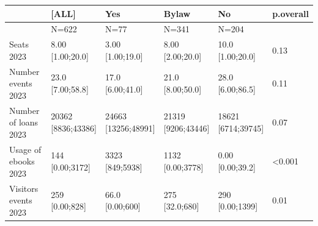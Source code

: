 \documentclass[a4paper,
fontsize=11pt,
oneside,
numbers=noperiodatend,
parskip=half-,
bibliography=totoc,
final
]{scrartcl}
\begin{document}
\begin{landscape}
\begin{table}[]\centering
\begin{tabular}{|l|l|l|l|l|l|}
\hline
                                 & \textbf{{[}ALL{]}}       & \textbf{Yes}             & \textbf{Bylaw}           & \textbf{No}            & \textbf{p.overall} \\ \hline
                                 & N=622                    & N=77                     & N=341                    & N=204                  &                    \\ \hline
Seats 2023                       & \makecell{8.00 \\ {[}1.00;20.0{]}}     & \makecell{3.00 \\ {[}1.00;19.0{]}}     & \makecell{8.00 \\ {[}2.00;20.0{]}}     & \makecell{10.0 \\ {[}1.00;20.0{]}}   & 0.13               \\ \hline
Number events 2023               & \makecell{23.0 \\ {[}7.00;58.8{]}}     & \makecell{17.0 \\ {[}6.00;41.0{]}}     & \makecell{21.0 \\ {[}8.00;50.0{]}}     & \makecell{28.0 \\ {[}6.00;86.5{]}}   & 0.11               \\ \hline
Number of loans 2023             & \makecell{20362 \\ {[}8836;43386{]}}   & \makecell{24663 \\ {[}13256;48991{]}}  & \makecell{21319 \\ {[}9206;43446{]}}   & \makecell{18621 \\ {[}6714;39745{]}} & 0.07               \\ \hline
Usage of ebooks 2023             & \makecell{144 \\ {[}0.00;3172{]}}      & \makecell{3323 \\ {[}849;5938{]}}      & \makecell{1132 \\ {[}0.00;3778{]}}     & \makecell{0.00 \\ {[}0.00;39.2{]}}   & \textless{}0.001   \\ \hline
Visitors events 2023             & \makecell{259 \\ {[}0.00;828{]}}       & \makecell{66.0 \\ {[}0.00;600{]}}      & \makecell{275 \\ {[}32.0;680{]}}       & \makecell{290 \\ {[}0.00;1399{]}}    & 0.01               \\ \hline

\end{tabular}
\end{table}
\end{landscape}
\end{document}
